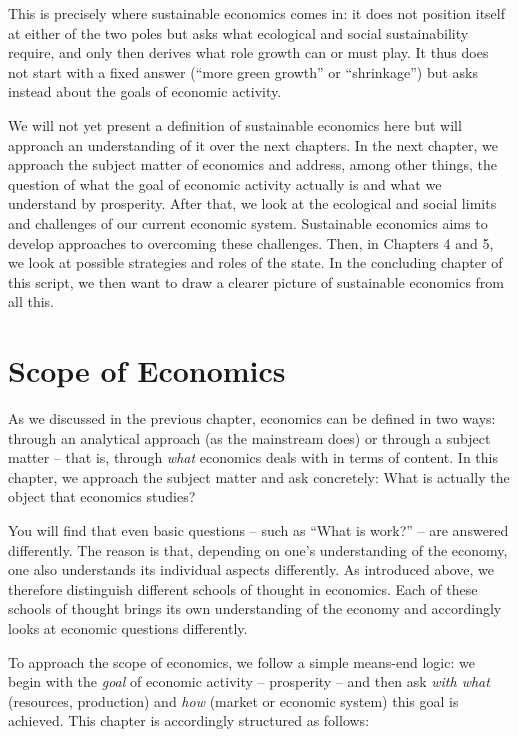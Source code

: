 \documentclass[
  british,
  a4paper,
  DIV=11,
  numbers=noendperiod,
  oneside,
  openany]{scrreprt}
\begin{document}
This is precisely where sustainable economics comes in: it does not
position itself at either of the two poles but asks what ecological and
social sustainability require, and only then derives what role growth
can or must play. It thus does not start with a fixed answer (``more
green growth'' or ``shrinkage'') but asks instead about the goals of
economic activity.

We will not yet present a definition of sustainable economics here but
will approach an understanding of it over the next chapters. In the next
chapter, we approach the subject matter of economics and address, among
other things, the question of what the goal of economic activity
actually is and what we understand by prosperity. After that, we look at
the ecological and social limits and challenges of our current economic
system. Sustainable economics aims to develop approaches to overcoming
these challenges. Then, in Chapters 4 and 5, we look at possible
strategies and roles of the state. In the concluding chapter of this
script, we then want to draw a clearer picture of sustainable economics
from all this.

\chapter{Scope of Economics}\label{scope-of-economics}

As we discussed in the previous chapter, economics can be defined in two
ways: through an analytical approach (as the mainstream does) or through
a subject matter -- that is, through \emph{what} economics deals with in
terms of content. In this chapter, we approach the subject matter and
ask concretely: What is actually the object that economics studies?

You will find that even basic questions -- such as ``What is work?'' --
are answered differently. The reason is that, depending on one's
understanding of the economy, one also understands its individual
aspects differently. As introduced above, we therefore distinguish
different schools of thought in economics. Each of these schools of
thought brings its own understanding of the economy and accordingly
looks at economic questions differently.

To approach the scope of economics, we follow a simple means-end logic:
we begin with the \emph{goal} of economic activity -- prosperity -- and
then ask \emph{with what} (resources, production) and \emph{how} (market
or economic system) this goal is achieved. This chapter is accordingly
structured as follows:
\end{document}
